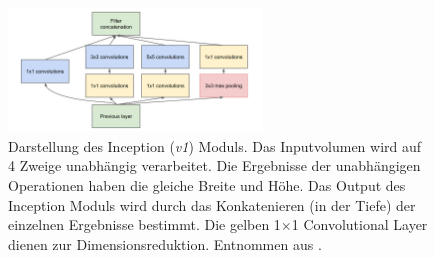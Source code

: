  \begin{figure}[Hb]
	\centering
	\includegraphics[width=0.60\textwidth]{images/googlenet/inception_module.png}
	\caption{Darstellung des Inception (\textit{v1}) Moduls. Das Inputvolumen wird auf 4 Zweige unabhängig verarbeitet. Die Ergebnisse der unabhängigen Operationen haben die gleiche Breite und Höhe. Das Output des Inception Moduls wird durch das Konkatenieren (in der Tiefe) der einzelnen Ergebnisse bestimmt. Die gelben 1$\times$1 Convolutional Layer dienen zur Dimensionsreduktion. Entnommen aus \cite{szegedyGoingDeeperConvolutions2015}.}
	\label{fig:inception_module}
\end{figure}

